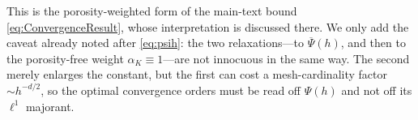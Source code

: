 \noindent This is the porosity{\hyp}weighted form of the main{\hyp}text bound
\eqref{eq:ConvergenceResult}, whose interpretation is discussed there. We only add the caveat
already noted after \eqref{eq:psih}: the two relaxations---to $\overline{\Psi}(h)$, and then to
the porosity{\hyp}free weight $\alpha_K\equiv1$---are not innocuous in the same way. The second
merely enlarges the constant, but the first can cost a mesh{\hyp}cardinality factor
$\sim h^{-d/2}$, so the optimal convergence orders must be read off $\Psi(h)$ and not off its
$\ell^1$ majorant.
